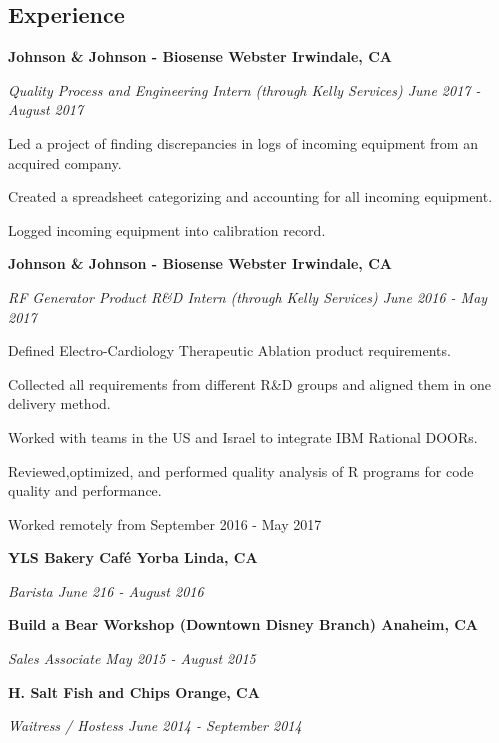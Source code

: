 \documentclass[10pt,letterpaper]{article}
\begin{document}
\subsection*{Experience}
\begin{rlist}
	\item \textbf{Johnson \& Johnson - Biosense Webster \hfill Irwindale, CA}
	\item \textit{Quality Process and Engineering Intern {\scriptsize(through Kelly Services)} \hfill June 2017 - August 2017}
	\begin{rlist}
		\item Led a project of finding discrepancies in logs of incoming equipment from an acquired company.
		\item Created a spreadsheet categorizing and accounting for all incoming equipment.
		\item Logged incoming equipment into calibration record.
	\end{rlist}
	\item \textbf{Johnson \& Johnson - Biosense Webster \hfill Irwindale, CA}
	\item \textit{RF Generator Product R\&D Intern {\scriptsize(through Kelly Services)} \normalsize\hfill June 2016 - May 2017}
	\begin{rlist}
		\item Defined Electro-Cardiology Therapeutic Ablation product requirements.
		\item Collected all requirements from different R\&D groups and aligned them in one delivery method.
		\item Worked with teams in the US and Israel to integrate IBM Rational DOORs.
		\item Reviewed,optimized, and performed quality analysis of R programs for code quality and performance.
		\item Worked remotely from September 2016 - May 2017 
	\end{rlist}
	\item \footnotesize\textbf{YLS Bakery Café \hfill Yorba Linda, CA}
	\item \footnotesize\textit{Barista \hfill June 216 - August 2016}
	\item \footnotesize\textbf{Build a Bear Workshop (Downtown Disney Branch) \hfill Anaheim, CA}
	\item \footnotesize\textit{Sales Associate \hfill May 2015 - August 2015}
	\item \footnotesize\textbf{H. Salt Fish and Chips \hfill Orange, CA}
	\item \footnotesize\textit{Waitress / Hostess \hfill June 2014 - September 2014}
\end{rlist}
\end{document}
